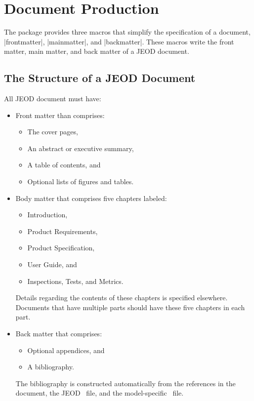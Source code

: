 \section{Document Production}
\label{sec:doc_production}
The \dynenv package provides three macros that simplify the specification of a
document, |frontmatter|, |mainmatter|, and |backmatter|. These macros write
the front matter, main matter, and back matter of a JEOD document.

\subsection{The Structure of a JEOD Document}
All JEOD document must have:
\begin{itemize}
\item Front matter than comprises:
  \begin{itemize}
  \item The cover pages,
  \item An abstract or executive summary,
  \item A table of contents, and
  \item Optional lists of figures and tables.
  \end{itemize}
\item Body matter that comprises five chapters labeled:
  \begin{itemize}
  \item Introduction,
  \item Product Requirements,
  \item Product Specification,
  \item User Guide, and
  \item Inspections, Tests, and Metrics.
  \end{itemize}
  Details regarding the contents of these chapters is specified elsewhere.
  Documents that have multiple parts should have these five chapters
  in each part.
\item Back matter that comprises:
  \begin{itemize}
  \item Optional appendices, and
  \item A bibliography.
  \end{itemize}
  The bibliography is constructed automatically from the references in the
  document, the JEOD \BibTeX\ file, and the model-specific \BibTeX\ file.
\end{itemize}

